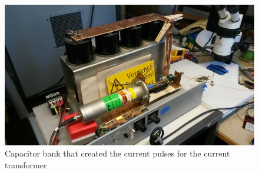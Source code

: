 \begin{figure}[h!tb]
\centerline{\includegraphics[scale=0.3]{figures/Method/Clamp/capacitorbank.jpg}}
    \caption{Capacitor bank that created the current pulses for the current transformer}
    \label{fig.clamp}
\end{figure}	



